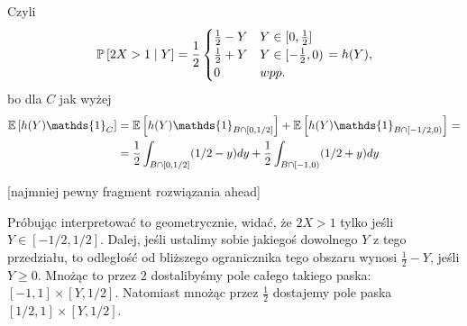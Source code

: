 \begin{solution}
  Czyli
  $$\prob{2X>1}{Y}=\frac{1}{2}\begin{cases}\frac{1}{2}-Y & Y\in[0, \frac{1}{2}]\\ \frac{1}{2}+Y & Y\in[-\frac{1}{2}, 0)\\ 0 & wpp.\end{cases}=h(Y),$$
  bo dla $C$ jak wyżej
  \begin{align*}
    \expected{h(Y)\mathds{1}_C}&=\expected{h(Y)\mathds{1}_{B\cap [0, 1/2]}}+\expected{h(Y)\mathds{1}_{B\cap[-1/2, 0)}}=\\ 
                               &=\frac{1}{2}\int_{B\cap [0, 1/2]}({1/2-y}) dy + \frac{1}{2}\int_{B\cap [-1, 0)}({1/2+y})dy
  \end{align*}

  [najmniej pewny fragment rozwiązania ahead]

  Próbując interpretować to geometrycznie, widać, że $2X>1$ tylko jeśli $Y\in[-1/2, 1/2]$. Dalej, jeśli ustalimy sobie jakiegoś dowolnego $Y$ z tego przedziału, to odległość od bliższego ogranicznika tego obszaru wynosi $\frac{1}{2}-Y$, jeśli $Y\geq 0$. Mnożąc to przez $2$ dostalibyśmy pole całego takiego paska: $[-1, 1]\times [Y, 1/2]$. Natomiast mnożąc przez $\frac{1}{2}$ dostajemy pole paska $[1/2, 1]\times[Y, 1/2]$.
  \begin{center}\end{center}
  \end{solution}
